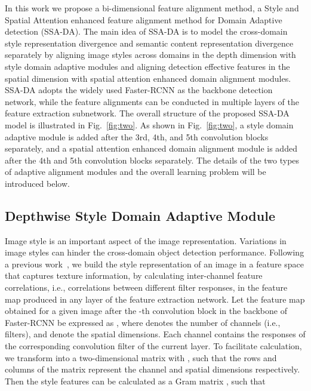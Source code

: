 \documentclass[runningheads]{llncs}
\begin{document}
In this work we propose a bi-dimensional feature alignment method, 
a Style and Spatial Attention enhanced feature alignment method for Domain Adaptive detection (SSA-DA).
The main idea of SSA-DA is to model the cross-domain style representation divergence and
semantic content representation divergence separately by
aligning image styles across domains in the depth dimension 
with style domain adaptive modules
and aligning detection effective features in the spatial dimension with spatial attention enhanced domain alignment modules. 
SSA-DA adopts the widely used Faster-RCNN as the backbone detection network, while
the feature alignments can be conducted in multiple layers of the feature extraction subnetwork. 
The overall structure of the proposed SSA-DA model is illustrated in Fig.~\ref{fig:two}.
As shown in Fig.~\ref{fig:two}, a style domain adaptive module is 
added after the 3rd, 4th, and 5th convolution blocks separately,
and a spatial attention enhanced domain alignment module is added
after the 4th and 5th convolution blocks separately.
The details of the two types of adaptive alignment modules 
and the overall learning problem will be introduced below.


\subsection{Depthwise Style Domain Adaptive Module}\label{section:style}

Image style is an important aspect of the image representation.
Variations in image styles can hinder the cross-domain object detection performance. 
Following a previous work~\cite{Gatys2016Image}, 
we build the style representation of an image in a feature space that captures texture information,
by calculating inter-channel feature correlations, i.e., correlations between
different filter responses,  in the feature map produced in any layer of the feature extraction network.
Let 
the feature map obtained for a given image  after the -th convolution block in the backbone of Faster-RCNN 
be expressed as ,
where  denotes the number of channels (i.e., filters), 
 and  denote the spatial dimensions. 
Each channel contains the responses of the corresponding convolution filter of the current layer. 
To facilitate calculation, 
we transform  into a two-dimensional matrix  with ,
such that the rows and columns of the matrix represent the channel and spatial dimensions respectively.
Then the style features can be calculated 
as a Gram matrix , such that
\end{document}
